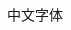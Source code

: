 \documentclass{article}
\begin{document}
\begin{CJK}{UTF8}{gbsn}

  中文字体
  
  
\end{CJK}
\end{document}
